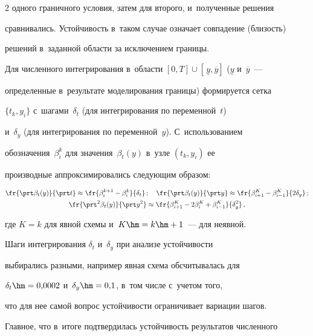 \begin{multicols}{2}
одного граничного условия, затем для второго, и~полученные решения 


сравнивались. Устойчивость в~таком случае означает совпадение (близость) 


решений в~заданной области за исключением границы.


     


     Для численного интегрирования в~области $[0,T]\cup \left[\, 


\underline{y}, \overline{y}\right]$ ($\underline{y}$ и~$\overline{y}$~--- 


определенные в~результате моделирования границы) формируется сетка 


$\{t_k, y_i\}$ с~шагами~$\delta_t$ (для интегрирования по переменной~$t$) 


и~$\delta_y$ (для интегрирования по переменной~$y$). С~использованием 


обозначения~$\beta_i^k$ для значения~$\beta_t(y)$ в~узле $(t_k, y_i)$ ее 


производные аппроксимировались следующим образом:


     \begin{gather*}


     \fr{\prt \beta_t(y)}{\prt t}\approx \fr{\beta_i^{k+1}-\beta_i^k}{\delta_t}\,;\quad


     \fr{\prt \beta_t(y)}{\prt y}\approx \fr{\beta^K_{i+1}-\beta^K_{i-


1}}{2\delta_y}\,;\\


     \fr{\prt^2\beta_t(y)}{\prt y^2}\approx \fr{\beta^K_{i+1}-


2\beta_i^K+\beta^K_{i-1}}{\delta_y^2}\,,


     \end{gather*}


где $K=k$ для явной схемы и~$K\hm=k\hm+1$~--- для неявной.


     


     Шаги интегрирования $\delta_t$ и~$\delta_y$ при анализе устойчивости 


выбирались разными, например явная схема обсчитывалась для 


$\delta_t\hm=0{,}0002$ и~$\delta_y\hm=0{,}1$, в~том числе с~учетом того, 


что для нее самой вопрос устойчивости ограничивает вариации шагов. 


Главное, что в~итоге подтвердилась устойчивость результатов численного 



\end{multicols}
